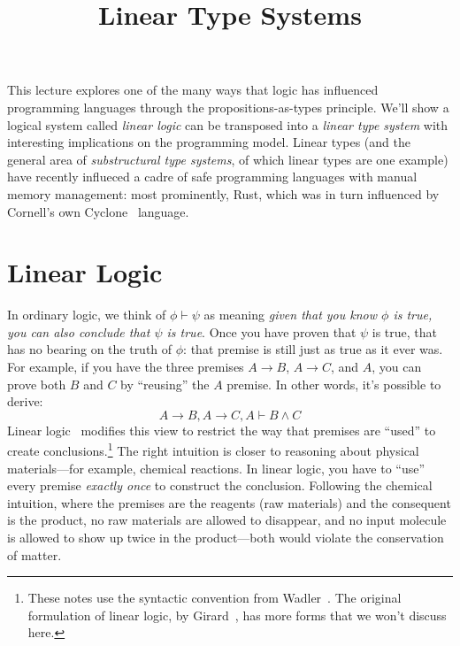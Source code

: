 \title{Linear Type Systems}
\maketitle

\newcommand\lolly{\multimap}

This lecture explores one of the many ways that logic has influenced
programming languages through the propositions-as-types principle. We'll show
a logical system called \emph{linear logic} can be transposed into a
\emph{linear type system} with interesting implications on the programming
model.
Linear types (and the general area of \emph{substructural type systems}, of
which linear types are one example) have recently influeced a cadre of safe
programming languages with manual memory management: most prominently,
Rust, which was in turn influenced by
Cornell's own Cyclone~\cite{cyclone} language.

\section{Linear Logic}

In ordinary logic, we think of $\phi \vdash \psi$ as meaning \emph{given that
you know $\phi$ is true, you can also conclude that $\psi$ is true}.
Once you have proven that $\psi$ is true, that has no bearing on the truth of
$\phi$: that premise is still just as true as it ever was.
For example, if you have the three premises $A \to B$, $A \to C$, and $A$, you
can prove both $B$ and $C$ by ``reusing'' the $A$ premise.
In other words, it's possible to derive:
%
$$A \to B, A \to C, A \vdash B \wedge C$$
%
Linear logic~\cite{lineartaste} modifies this view to restrict the way that premises are ``used''
to create conclusions.\footnote{These notes use the syntactic convention from
Wadler~\cite{lineartaste}. The original formulation of linear logic, by
Girard~\cite{linear}, has more forms that we won't discuss here.}
The right intuition is closer to reasoning about physical materials---for
example, chemical reactions.
In linear logic, you have to ``use'' every premise \emph{exactly once} to
construct the conclusion.
Following the chemical intuition, where the premises are the reagents (raw
materials) and the consequent is the product, no raw materials are allowed to
disappear, and no input molecule is allowed to show up twice in the
product---both would violate the conservation of matter.

